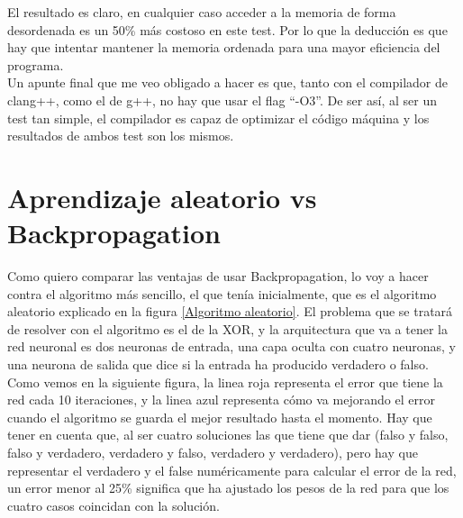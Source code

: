 El resultado es claro, en cualquier caso acceder a la memoria de forma desordenada es un 50\% más costoso en este test. Por lo que la deducción es que hay que intentar mantener la memoria ordenada para una mayor eficiencia del programa. 
\\
Un apunte final que me veo obligado a hacer es que, tanto con el compilador de clang++, como el de g++, no hay que usar el flag ``-O3''. De ser así, al ser un test tan simple, el compilador es capaz de optimizar el código máquina y los resultados de ambos test son los mismos.

\section{Aprendizaje aleatorio vs Backpropagation}
\label{aleatorio vs backpropagation resultados}
Como quiero comparar las ventajas de usar Backpropagation, lo voy a hacer contra el algoritmo más sencillo, el que tenía inicialmente, que es el algoritmo aleatorio explicado en la figura \ref{Algoritmo aleatorio}. El problema que se tratará de resolver con el algoritmo es el de la XOR, y la arquitectura que va a tener la red neuronal es dos neuronas de entrada, una capa oculta con cuatro neuronas, y una neurona de salida que dice si la entrada ha producido verdadero o falso. 
\\
Como vemos en la siguiente figura, la linea roja representa el error que tiene la red cada 10 iteraciones, y la linea azul representa cómo va mejorando el error cuando el algoritmo se guarda el mejor resultado hasta el momento. Hay que tener en cuenta que, al ser cuatro soluciones las que tiene que dar (falso y falso, falso y verdadero, verdadero y falso, verdadero y verdadero), pero hay que representar el verdadero y el false numéricamente para calcular el error de la red, un error menor al 25\% significa que ha ajustado los pesos de la red para que los cuatro casos coincidan con la solución.
